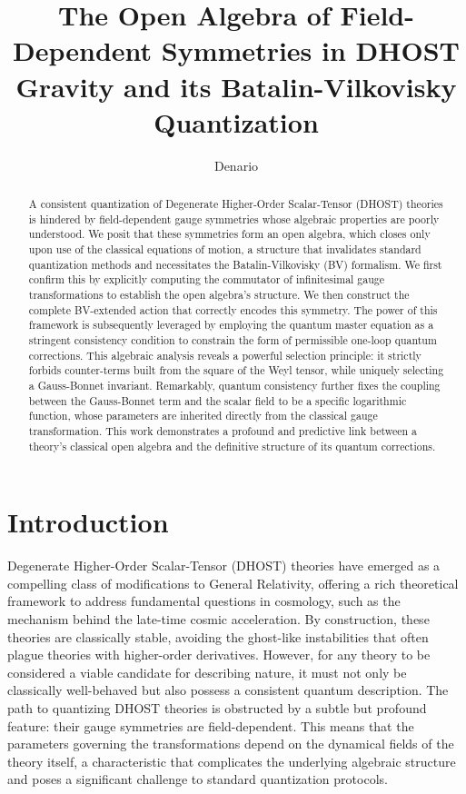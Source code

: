 \documentclass[twocolumn]{aastex631}
\begin{document}
\title{The Open Algebra of Field-Dependent Symmetries in DHOST Gravity and its Batalin-Vilkovisky Quantization}

\author{Denario}

\begin{abstract}
A consistent quantization of Degenerate Higher-Order Scalar-Tensor (DHOST) theories is hindered by field-dependent gauge symmetries whose algebraic properties are poorly understood. We posit that these symmetries form an open algebra, which closes only upon use of the classical equations of motion, a structure that invalidates standard quantization methods and necessitates the Batalin-Vilkovisky (BV) formalism. We first confirm this by explicitly computing the commutator of infinitesimal gauge transformations to establish the open algebra's structure. We then construct the complete BV-extended action that correctly encodes this symmetry. The power of this framework is subsequently leveraged by employing the quantum master equation as a stringent consistency condition to constrain the form of permissible one-loop quantum corrections. This algebraic analysis reveals a powerful selection principle: it strictly forbids counter-terms built from the square of the Weyl tensor, while uniquely selecting a Gauss-Bonnet invariant. Remarkably, quantum consistency further fixes the coupling between the Gauss-Bonnet term and the scalar field to be a specific logarithmic function, whose parameters are inherited directly from the classical gauge transformation. This work demonstrates a profound and predictive link between a theory's classical open algebra and the definitive structure of its quantum corrections.
\end{abstract}



\section{Introduction}
\label{sec:intro}
Degenerate Higher-Order Scalar-Tensor (DHOST) theories have emerged as a compelling class of modifications to General Relativity, offering a rich theoretical framework to address fundamental questions in cosmology, such as the mechanism behind the late-time cosmic acceleration. By construction, these theories are classically stable, avoiding the ghost-like instabilities that often plague theories with higher-order derivatives. However, for any theory to be considered a viable candidate for describing nature, it must not only be classically well-behaved but also possess a consistent quantum description. The path to quantizing DHOST theories is obstructed by a subtle but profound feature: their gauge symmetries are field-dependent. This means that the parameters governing the transformations depend on the dynamical fields of the theory itself, a characteristic that complicates the underlying algebraic structure and poses a significant challenge to standard quantization protocols.
\end{document}
